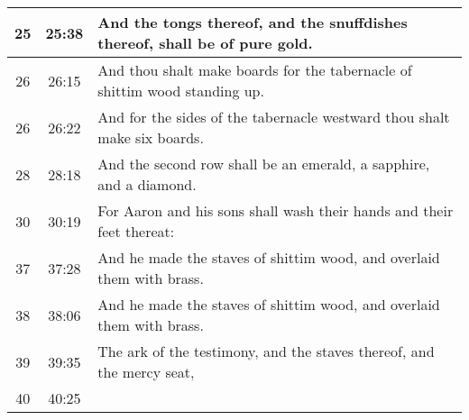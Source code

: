 \begin{center}
\begin{longtable}{c|c|p{3.5in}}
25 & 25:38 &  And the tongs thereof, and the snuffdishes thereof, shall be of pure gold.\\ \hline
26 & 26:15 &  And thou shalt make boards for the tabernacle of shittim wood standing up.\\ 
26 & 26:22 & And for the sides of the tabernacle westward thou shalt make six boards.\\ \hline
28 & 28:18 & And the second row shall be an emerald, a sapphire, and a diamond.\\ \hline
30 & 30:19 & For Aaron and his sons shall wash their hands and their feet
thereat:\\ \hline
37 & 37:28  &And he made the staves of shittim wood, and overlaid them with brass. \\ \hline
38 & 38:06  & And he made the staves of shittim wood, and overlaid them with brass. \\ \hline
39 & 39:35  & The ark of the testimony, and the staves thereof, and the mercy seat, \\ \hline
40 & 40:25  &  \\ \hline


\hline \hline



\end{longtable}
\end{center}